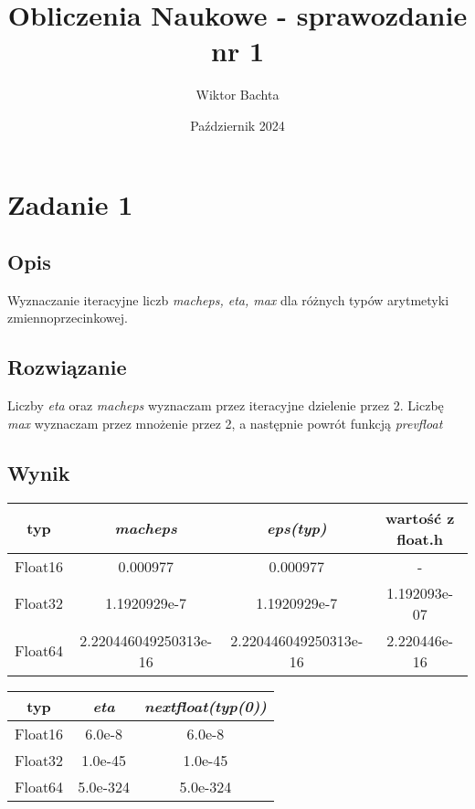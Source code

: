 \documentclass[12pt, letterpaper]{article}
\title{Obliczenia Naukowe - sprawozdanie nr 1}
\author{Wiktor Bachta}
\date{Październik 2024}
\begin{document}
\maketitle

\section{Zadanie 1}

\subsection{Opis}

Wyznaczanie iteracyjne liczb \textit{macheps, eta, max}
dla różnych typów arytmetyki zmiennoprzecinkowej.

\subsection{Rozwiązanie}

Liczby \textit{eta} oraz \textit{macheps} wyznaczam przez iteracyjne dzielenie
przez 2.
Liczbę \textit{max} wyznaczam przez mnożenie przez 2, a następnie powrót
funkcją \textit{prevfloat}

\subsection{Wynik}

\begin{center}
    \begin{tabular}{|c | c | c| c |}
        \hline
        typ     & \textit{macheps}      & \textit{eps(typ)}     & wartość z
        float.h
        \\
        \hline
        Float16 & 0.000977              & 0.000977              & -
        \\
        \hline
        Float32 & 1.1920929e-7          & 1.1920929e-7          & 1.192093e-07
        \\
        \hline
        Float64 & 2.220446049250313e-16 & 2.220446049250313e-16 &
        2.220446e-16
        \\
        \hline
    \end{tabular}
\end{center}

\begin{center}
    \begin{tabular}{|c | c | c|}
        \hline
        typ     & \textit{eta} & \textit{nextfloat(typ(0))} \\
        \hline
        Float16 & 6.0e-8       & 6.0e-8                     \\
        \hline
        Float32 & 1.0e-45      & 1.0e-45                    \\
        \hline
        Float64 & 5.0e-324     & 5.0e-324                   \\
        \hline
    \end{tabular}
\end{center}
\end{document}
